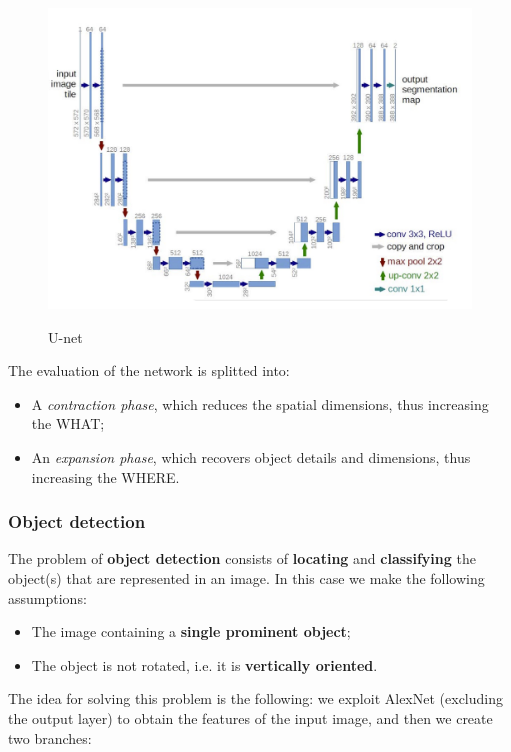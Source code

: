 \begin{figure}[h!]
		\centering
        \includegraphics[scale = 0.3]{img/unet.jpg}
		\label{unet}
        \caption{U-net}
\end{figure}

The evaluation of the network is splitted into:

\begin{itemize}
    \item A \textit{contraction phase}, which reduces the spatial dimensions, thus increasing the WHAT;
    \item An \textit{expansion phase}, which recovers object details and dimensions, thus increasing the WHERE.
\end{itemize}

\subsubsection{Object detection}
The problem of \textbf{object detection} consists of \textbf{locating} and \textbf{classifying} the object(s) that are represented in an image. In this case we make the following assumptions:

\begin{itemize}
    \item The image containing a \textbf{single prominent object};
    \item The object is not rotated, i.e. it is \textbf{vertically oriented}.
\end{itemize}

The idea for solving this problem is the following: we exploit AlexNet (excluding the output layer) to obtain the features of the input image, and then we create two branches:

